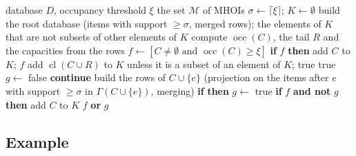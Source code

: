 \documentclass[pdflatex,sn-mathphys,Numbered]{sn-jnl}
\theoremstyle{thmstyleone}
\theoremstyle{thmstyletwo}
\theoremstyle{thmstylethree}
\newcommand{\occ}{\operatorname{occ}}
\newcommand{\cl}{\operatorname{cl}}
\newcommand{\MHOI}{\mathcal{M}}
\newcommand{\Algo}{MHOI-Miner}
\begin{document}
\begin{algorithm}[t]
\caption{\Algo}\label{alg:main}
\begin{algorithmic}[1]
\Require database $D$, occupancy threshold $\xi$
\Ensure the set $\MHOI$ of MHOIs
\State $\sigma \gets \lceil \xi \rceil$; $K \gets \emptyset$ 
\State build the root database (items with support $\ge \sigma$, merged rows); 
\State \Return the elements of $K$ that are not subsets of other elements of $K$
\Statex
{} 
  \State compute $\occ(C)$, the tail $R$ and the capacities from the rows
  \State $f \gets [C \neq \emptyset \text{ and } \occ(C) \ge \xi]$
   
    \State \textbf{if} $f$ \textbf{then} add $C$ to $K$; \Return $f$
  \EndIf
  \If{$\occ(C \cup R) \ge \xi$} 
    \State add $\cl(C \cup R)$ to $K$ unless it is a subset of an element of $K$; \Return true
  \EndIf
   \Return true 
  \EndIf
  \State $g \gets$ false
     \textbf{continue} 
    \EndIf
    \State build the rows of $C \cup \{e\}$ (projection on the items after $e$ with support $\ge \sigma$ in $\Gamma(C \cup \{e\})$, merging)
    \State \textbf{if}  \textbf{then} $g \gets$ true
  \EndFor
  \State \textbf{if} $f$ \textbf{and not} $g$ \textbf{then} add $C$ to $K$
  \State \Return $f$ \textbf{or} $g$
\EndFunction
\end{algorithmic}
\end{algorithm}

\subsection{Example}
\end{document}
